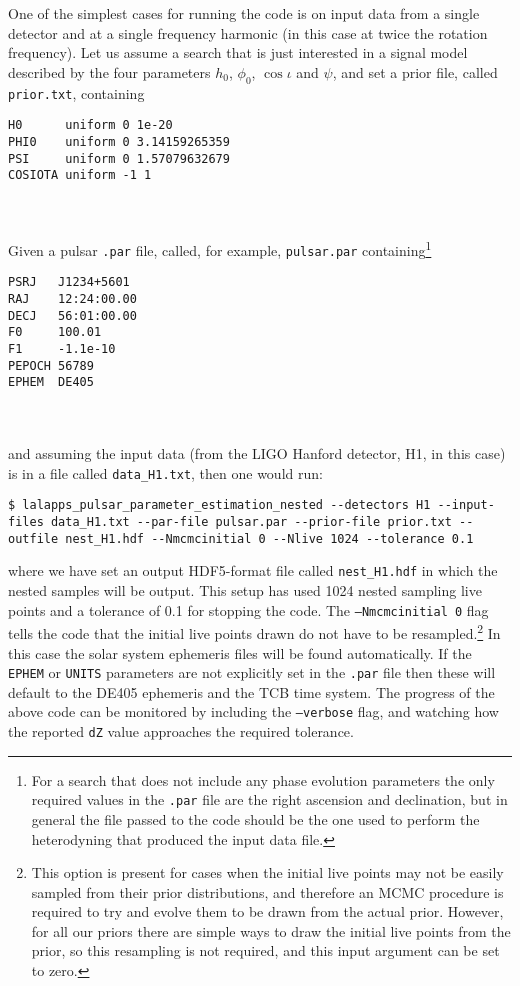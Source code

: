 One of the simplest cases for running the code is on input data from a single detector and at a single frequency harmonic (in this
case at twice the rotation frequency). Let us assume a search that is just interested in a signal model described by the four parameters
$h_0$, $\phi_0$, $\cos{\iota}$ and $\psi$, and set a prior file, called {\tt prior.txt}, containing
\begin{lrbox}{\Lst}
\begin{lstlisting}
H0      uniform 0 1e-20
PHI0    uniform 0 3.14159265359
PSI     uniform 0 1.57079632679
COSIOTA uniform -1 1
\end{lstlisting}
\end{lrbox}
\\[5pt] \indent \fbox{\usebox{\Lst}} \\[5pt]
Given a pulsar {\tt .par} file, called, for example, {\tt pulsar.par} containing\footnote{For a search that does not include any phase evolution parameters
the only required values in the {\tt .par} file are the right ascension and declination, but in general the file passed to the code should be the one used
to perform the heterodyning that produced the input data file.}
\begin{lrbox}{\Lst}
\begin{lstlisting}
PSRJ   J1234+5601
RAJ    12:24:00.00
DECJ   56:01:00.00
F0     100.01
F1     -1.1e-10
PEPOCH 56789
EPHEM  DE405
\end{lstlisting}
\end{lrbox}
\\[5pt] \indent \fbox{\usebox{\Lst}} \\[5pt]
and assuming the input data (from the LIGO Hanford detector, H1, in this case) is in a file called {\tt data\_H1.txt}, then one would run:
\begin{lstlisting}[frame=single]
$ lalapps_pulsar_parameter_estimation_nested --detectors H1 --input-files data_H1.txt --par-file pulsar.par --prior-file prior.txt --outfile nest_H1.hdf --Nmcmcinitial 0 --Nlive 1024 --tolerance 0.1
\end{lstlisting}
where we have set an output HDF5-format file called {\tt nest\_H1.hdf} in which the nested samples will be output. This setup has used 1024 nested sampling
live points and a tolerance of 0.1 for stopping the code. The {\tt --Nmcmcinitial 0} flag tells the code that the initial live points drawn do not have to
be resampled.\footnote{This option is present for cases when the initial live points may not be easily sampled from their prior distributions, and therefore
an MCMC procedure is required to try and evolve them to be drawn from the actual prior. However, for all our priors there are simple ways to draw the initial
live points from the prior, so this resampling is not required, and this input argument can be set to zero.} In this case the solar system ephemeris files
will be found automatically. If the {\tt EPHEM} or {\tt UNITS} parameters are not explicitly set in the {\tt .par} file then these will default to the
DE405 ephemeris and the TCB time system. The progress of the above code can be monitored by including the {\tt --verbose} flag, and watching how the
reported {\tt dZ} value approaches the required tolerance.

